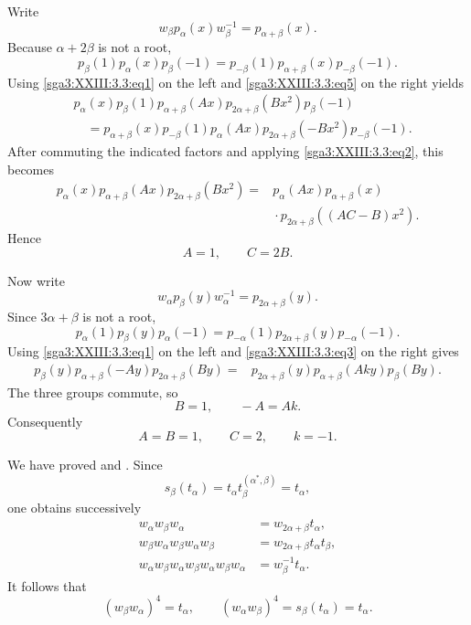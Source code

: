 Write
\[
  w_\beta p_\alpha(x)w_\beta^{-1}=p_{\alpha+\beta}(x).
\]
Because \(\alpha+2\beta\) is not a root,
\[
  p_\beta(1)p_\alpha(x)p_\beta(-1)
    =p_{-\beta}(1)p_{\alpha+\beta}(x)p_{-\beta}(-1).
\]
Using \eqref{sga3:XXIII:3.3:eq1} on the left and
\eqref{sga3:XXIII:3.3:eq5} on the right yields
\[
\begin{aligned}
  &p_\alpha(x)p_\beta(1)p_{\alpha+\beta}(Ax)
    p_{2\alpha+\beta}(Bx^2)p_\beta(-1)\\
  &\quad=p_{\alpha+\beta}(x)p_{-\beta}(1)p_\alpha(Ax)
    p_{2\alpha+\beta}(-Bx^2)p_{-\beta}(-1).
\end{aligned}
\]
After commuting the indicated factors and applying
\eqref{sga3:XXIII:3.3:eq2}, this becomes
\[
\begin{aligned}
  p_\alpha(x)p_{\alpha+\beta}(Ax)p_{2\alpha+\beta}(Bx^2)
  ={}&p_\alpha(Ax)p_{\alpha+\beta}(x)\\
     &{}\cdot p_{2\alpha+\beta}((AC-B)x^2).
\end{aligned}
\]
Hence
\[
  A=1,\qquad C=2B.
\]

Now write
\[
  w_\alpha p_\beta(y)w_\alpha^{-1}=p_{2\alpha+\beta}(y).
\]
Since \(3\alpha+\beta\) is not a root,
\[
  p_\alpha(1)p_\beta(y)p_\alpha(-1)
    =p_{-\alpha}(1)p_{2\alpha+\beta}(y)p_{-\alpha}(-1).
\]
Using \eqref{sga3:XXIII:3.3:eq1} on the left and
\eqref{sga3:XXIII:3.3:eq3} on the right gives
\[
\begin{aligned}
  p_\beta(y)p_{\alpha+\beta}(-Ay)p_{2\alpha+\beta}(By)
  ={}&p_{2\alpha+\beta}(y)p_{\alpha+\beta}(Aky)p_\beta(By).
\end{aligned}
\]
The three groups commute, so
\[
  B=1,\qquad -A=Ak.
\]
Consequently
\[
  A=B=1,\qquad C=2,\qquad k=-1.
\]

We have proved  and . Since
\[
  s_\beta(t_\alpha)
    =t_\alpha t_\beta^{(\alpha^*,\beta)}
    =t_\alpha,
\]
one obtains successively
\[
\begin{aligned}
  w_\alpha w_\beta w_\alpha
    &=w_{2\alpha+\beta}t_\alpha,\\
  w_\beta w_\alpha w_\beta w_\alpha w_\beta
    &=w_{2\alpha+\beta}t_\alpha t_\beta,\\
  w_\alpha w_\beta w_\alpha w_\beta w_\alpha w_\beta w_\alpha
    &=w_\beta^{-1}t_\alpha.
\end{aligned}
\]
It follows that
\[
  (w_\beta w_\alpha)^4=t_\alpha,
  \qquad
  (w_\alpha w_\beta)^4=s_\beta(t_\alpha)=t_\alpha.
\]

